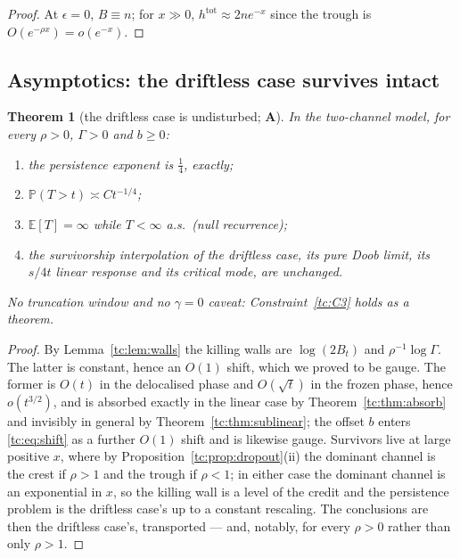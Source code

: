 \documentclass[11pt]{article}
\numberwithin{equation}{section}
\theoremstyle{plain}
\newtheorem{theorem}{Theorem}[section]
\theoremstyle{definition}
\theoremstyle{remark}
\newcommand{\E}{\mathbb{E}}
\newcommand{\PP}{\mathbb{P}}
\begin{document}
\begin{proof}
At $\epsilon=0$, $B\equiv n$; for $x\gg0$, $h^{\mathrm{tot}}\approx
2ne^{-x}$ since the trough is $O(e^{-\rho x})=o(e^{-x})$.
\end{proof}

\subsection{Asymptotics: the driftless case survives intact}
\label{tc:sub:asymptotics}

\begin{theorem}[the driftless case is undisturbed; \textbf{A}]
\label{tc:thm:survives}
In the two-channel model, for every $\rho>0$, $\Gamma>0$ and $b\ge0$:
\begin{enumerate}[label=\emph{(\roman*)},itemsep=1pt]
\item the persistence exponent is $\tfrac14$, exactly;
\item $\PP(T>t)\asymp Ct^{-1/4}$;
\item $\E[T]=\infty$ while $T<\infty$ a.s.\ (null recurrence);
\item the survivorship interpolation of the driftless case, its pure Doob
limit, its $s/4t$ linear response and its critical mode, are unchanged.
\end{enumerate}
\emph{No truncation window and no $\gamma=0$ caveat}:
Constraint~\ref{tc:C3} holds as a theorem.
\end{theorem}

\begin{proof}
By Lemma~\ref{tc:lem:walls} the killing walls are $\log(2B_t)$ and
$\rho^{-1}\log\Gamma$. The latter is constant, hence an $O(1)$ shift,
which we proved to be gauge. The former is $O(t)$ in the
delocalised phase and $O(\sqrt t)$ in the frozen phase, hence
$o(t^{3/2})$, and is absorbed exactly in the linear case by
Theorem~\ref{tc:thm:absorb} and invisibly in general by
Theorem~\ref{tc:thm:sublinear}; the offset $b$ enters
\eqref{tc:eq:shift} as a further $O(1)$ shift and is likewise gauge.
Survivors live at large positive $x$, where by
Proposition~\ref{tc:prop:dropout}(ii) the dominant channel is the crest
if $\rho>1$ and the trough if $\rho<1$; in either case the dominant
channel is an exponential in $x$, so the killing wall is a level of the
credit and the persistence problem is the driftless case's up to a constant
rescaling. The conclusions are then the driftless case's, transported --- and,
notably, for every $\rho>0$ rather than only $\rho>1$.
\end{proof}
\end{document}
